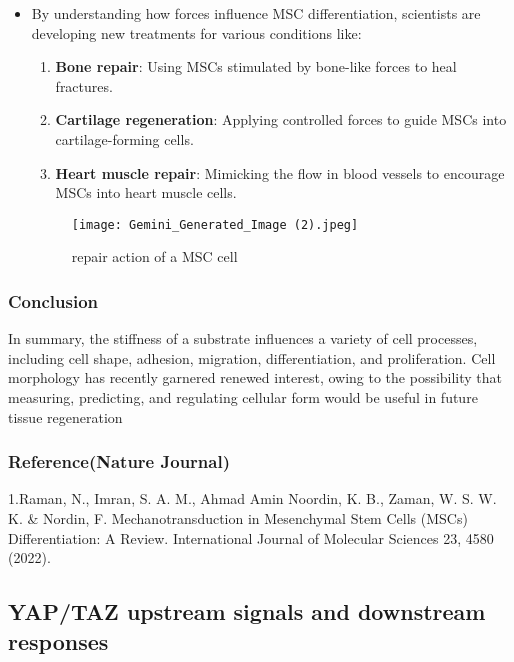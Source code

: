 \documentclass{article}
\begin{document}
\begin{itemize}
\begin{enumerate}
\end{enumerate}
   \item  By understanding how forces influence MSC differentiation, scientists are developing new treatments for various conditions like:

\begin{enumerate}
\item \textbf{Bone repair}: Using MSCs stimulated by bone-like forces to heal fractures.
\item \textbf{Cartilage regeneration}: Applying controlled forces to guide MSCs into cartilage-forming cells.
\item \textbf{Heart muscle repair}: Mimicking the flow in blood vessels to encourage MSCs into heart muscle cells.
\end{enumerate}
\begin{figure}[h]
    \centering
    \texttt{[image: Gemini\_Generated\_Image (2).jpeg]}
    \caption{repair action of a MSC cell}
    \label{fig:enter-label}
\end{figure}
\end{itemize}
\subsubsection{Conclusion}
In summary, the stiffness of a substrate influences a variety of cell processes, including cell shape, adhesion, migration, differentiation, and proliferation. Cell morphology has recently garnered renewed interest, owing to the possibility that measuring, predicting, and regulating cellular form would be useful in future tissue regeneration
\subsubsection{Reference(Nature Journal)}
1.Raman, N., Imran, S. A. M., Ahmad Amin Noordin, K. B., Zaman, W. S. W. K. & Nordin, F. Mechanotransduction in Mesenchymal Stem Cells (MSCs) Differentiation: A Review. International Journal of Molecular Sciences 23, 4580 (2022).
\newpage
\subsection{YAP/TAZ upstream signals and downstream responses}
\end{document}
